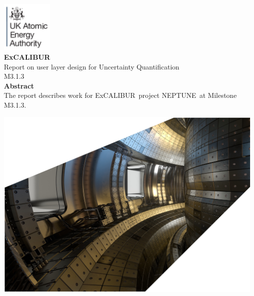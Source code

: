 \documentclass[11pt,twoside,a4paper]{article}
\newcommand{\nep}{\textsc{NEPTUNE}}
\newcommand{\exc}{\textsc{E}x\textsc{CALIBUR}}
\newcommand{\culhamtitle}{\LARGE Report on user layer design for
Uncertainty Quantification\\[1.0\baselineskip] M3.1.3 }%
\begin{document}
\begin{titlepage}
\includegraphics[width=2.5cm]{../corpics/cofaplus} \\[2.0\baselineskip]
{\LARGE {\textbf{\textsf{ExCALIBUR}}}}\\[2.0\baselineskip]
{\LARGE \culhamtitle } \\[2.0\baselineskip]
{\textbf{\textsf{Abstract}}}\\
The report describes work for \exc \ project \nep \
at Milestone M3.1.3.

\vfill
\hspace{-20mm}\includegraphics[width=18.0cm]{../corpics/tokintcrop}
\end{titlepage}

\clearpage
%
\end{document}
